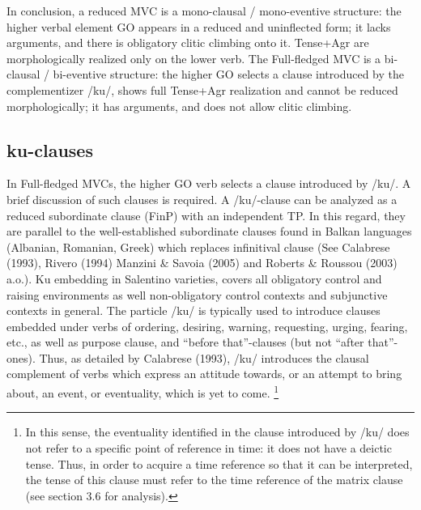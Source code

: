 \documentclass[output=paper,colorlinks,citecolor=brown,
]{langscibook}
\begin{document}
\ea
    \z
\z

In conclusion, a reduced MVC is a mono-clausal / mono-eventive structure: the higher verbal element GO appears in a reduced and uninflected form; it lacks arguments, and there is obligatory clitic climbing onto it.   Tense+Agr are morphologically realized only on the lower verb.  The Full-fledged MVC is a bi-clausal / bi-eventive structure: the higher GO selects a clause introduced by the complementizer /ku/, shows full Tense+Agr realization and cannot be reduced morphologically; it has arguments, and does not allow clitic climbing. 

\subsection{ku-clauses}

In Full-fledged MVCs, the higher GO verb selects a clause introduced by /ku/.  A brief discussion of such clauses is required.  A /ku/-clause can be analyzed as a reduced subordinate clause (FinP) with an independent TP.  In this regard, they are parallel to the well-established subordinate clauses found in Balkan languages (Albanian, Romanian, Greek) which replaces infinitival clause (See Calabrese (1993), Rivero (1994) Manzini \& Savoia (2005) and Roberts \& Roussou (2003) a.o.). Ku embedding in Salentino varieties, covers all obligatory control and raising environments as well non-obligatory control contexts and subjunctive contexts in general. The particle /ku/ is typically used to introduce clauses embedded under verbs of ordering, desiring, warning, requesting, urging, fearing, etc., as well as purpose clause, and “before that”-clauses (but not “after that”-ones). Thus, as detailed by Calabrese (1993), /ku/ introduces the clausal complement of verbs which express an attitude towards, or an attempt to bring about, an event, or eventuality, which is yet to come. \footnote{In this sense, the eventuality identified in the clause introduced by /ku/ does not refer to a specific point of reference in time: it does not have a deictic tense.  Thus, in order to acquire a time reference so that it can be interpreted, the tense of this clause must refer to the time reference of the matrix clause (see section 3.6 for analysis).}
\end{document}

